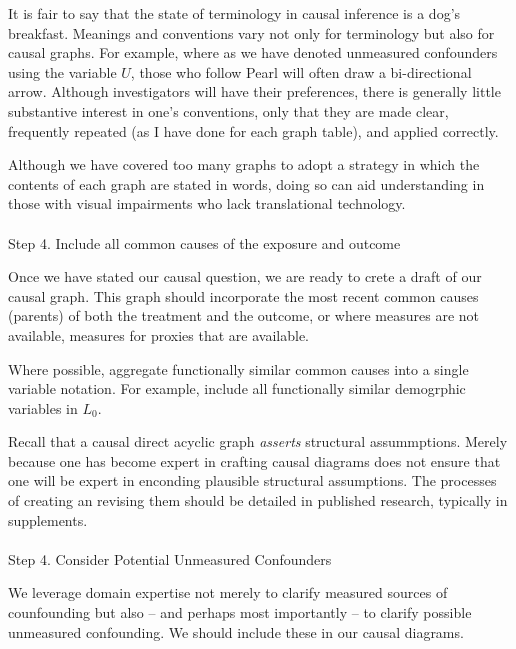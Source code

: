 \documentclass[
  single column]{article}
\makeatletter
\let\oldparagraph\paragraph
\renewcommand{\paragraph}{
    \@ifstar
      \xxxParagraphStar
      \xxxParagraphNoStar
  }
\newcommand{\xxxParagraphStar}[1]{\oldparagraph*{#1}\mbox{}}
\newcommand{\xxxParagraphNoStar}[1]{\oldparagraph{#1}\mbox{}}
\makeatother
\begin{document}
It is fair to say that the state of terminology in causal inference is a
dog's breakfast. Meanings and conventions vary not only for terminology
but also for causal graphs. For example, where as we have denoted
unmeasured confounders using the variable \(U\), those who follow Pearl
will often draw a bi-directional arrow. Although investigators will have
their preferences, there is generally little substantive interest in
one's conventions, only that they are made clear, frequently repeated
(as I have done for each graph table), and applied correctly.

Although we have covered too many graphs to adopt a strategy in which
the contents of each graph are stated in words, doing so can aid
understanding in those with visual impairments who lack translational
technology.

\paragraph{Step 4. Include all common causes of the exposure and
outcome}\label{step-4.-include-all-common-causes-of-the-exposure-and-outcome}

Once we have stated our causal question, we are ready to crete a draft
of our causal graph. This graph should incorporate the most recent
common causes (parents) of both the treatment and the outcome, or where
measures are not available, measures for proxies that are available.

Where possible, aggregate functionally similar common causes into a
single variable notation. For example, include all functionally similar
demogrphic variables in \(L_0\).

Recall that a causal direct acyclic graph \emph{asserts} structural
assummptions. Merely because one has become expert in crafting causal
diagrams does not ensure that one will be expert in enconding plausible
structural assumptions. The processes of creating an revising them
should be detailed in published research, typically in supplements.

\paragraph{Step 4. Consider Potential Unmeasured
Confounders}\label{step-4.-consider-potential-unmeasured-confounders}

We leverage domain expertise not merely to clarify measured sources of
counfounding but also -- and perhaps most importantly -- to clarify
possible unmeasured confounding. We should include these in our causal
diagrams.
\end{document}
